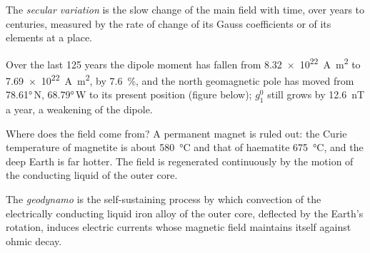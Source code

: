 \begin{definition}\label{def:b3:palaeomagnetism:secular}
The \emph{secular variation} is the slow change of the
main field with time, over years to centuries, measured by the rate of change
of its Gauss coefficients or of its elements at a place.
\end{definition}

Over the last 125 years the dipole moment has fallen from
\qty{8.32e22}{A.m^2} to \qty{7.69e22}{A.m^2}, by \qty{7.6}{\percent}, and the
north geomagnetic pole has moved from \ang{78.61}\,N, \ang{68.79}\,W to its
present position (figure below); $g_1^0$ still grows by \qty{12.6}{nT} a year,
a weakening of the dipole.

\begin{omfigure}

\par{}\label{fig:b3:palaeomagnetism:dipole}
\end{omfigure}

Where does the field come from? A permanent magnet is ruled out: the Curie
temperature of magnetite is about \qty{580}{\celsius} and that of haematite
\qty{675}{\celsius}, and the deep Earth is far hotter. The field is
regenerated continuously by the motion of the conducting liquid of the outer
core.

\begin{definition}[Geodynamo]\label{def:b3:palaeomagnetism:geodynamo}
The \emph{geodynamo} is the self-sustaining process by which
convection of the electrically conducting liquid iron alloy of the outer core,
deflected by the Earth's rotation, induces electric currents whose magnetic
field maintains itself against ohmic decay.
\end{definition}

